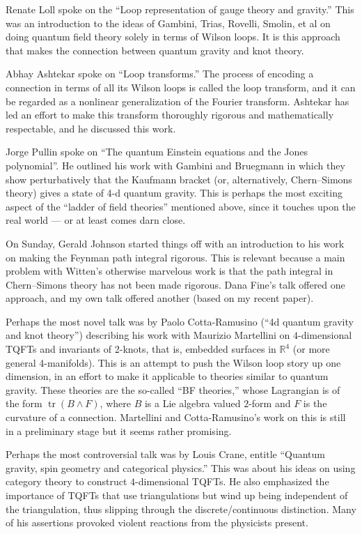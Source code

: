 \documentclass[12pt]{article}
\begin{document}
Renate Loll spoke on the ``Loop representation of gauge theory and
gravity.'' This was an introduction to the ideas of Gambini, Trias,
Rovelli, Smolin, et al on doing quantum field theory solely in terms of
Wilson loops. It is this approach that makes the connection between
quantum gravity and knot theory.

Abhay Ashtekar spoke on ``Loop transforms.'' The process of encoding a
connection in terms of all its Wilson loops is called the loop
transform, and it can be regarded as a nonlinear generalization of the
Fourier transform. Ashtekar has led an effort to make this transform
thoroughly rigorous and mathematically respectable, and he discussed
this work.

Jorge Pullin spoke on ``The quantum Einstein equations and the Jones
polynomial''. He outlined his work with Gambini and Bruegmann in which
they show perturbatively that the Kaufmann bracket (or, alternatively,
Chern--Simons theory) gives a state of 4-d quantum gravity. This is
perhaps the most exciting aspect of the ``ladder of field theories''
mentioned above, since it touches upon the real world --- or at least
comes darn close.

On Sunday, Gerald Johnson started things off with an introduction to his
work on making the Feynman path integral rigorous. This is relevant
because a main problem with Witten's otherwise marvelous work is that
the path integral in Chern--Simons theory has not been made rigorous.
Dana Fine's talk offered one approach, and my own talk offered another
(based on my recent paper).

Perhaps the most novel talk was by Paolo Cotta-Ramusino (``4d quantum
gravity and knot theory'') describing his work with Maurizio Martellini
on \(4\)-dimensional TQFTs and invariants of 2-knots, that is, embedded
surfaces in \(\mathbb{R}^4\) (or more general 4-manifolds). This is an
attempt to push the Wilson loop story up one dimension, in an effort to
make it applicable to theories similar to quantum gravity. These
theories are the so-called ``BF theories,'' whose Lagrangian is of the
form \(\operatorname{tr}(B \wedge F)\), where \(B\) is a Lie algebra
valued \(2\)-form and \(F\) is the curvature of a connection. Martellini
and Cotta-Ramusino's work on this is still in a preliminary stage but it
seems rather promising.

Perhaps the most controversial talk was by Louis Crane, entitle
``Quantum gravity, spin geometry and categorical physics.'' This was
about his ideas on using category theory to construct \(4\)-dimensional
TQFTs. He also emphasized the importance of TQFTs that use
triangulations but wind up being independent of the triangulation, thus
slipping through the discrete/continuous distinction. Many of his
assertions provoked violent reactions from the physicists present.
\end{document}
